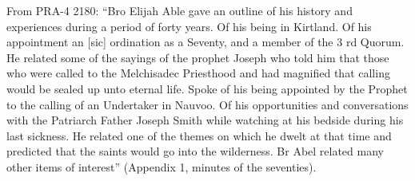 			From PRA-4 2180: ``Bro Elijah Able gave an outline of his history and experiences during a period of forty years. Of his being in Kirtland. Of his appointment an [sic] ordination as a Seventy, and a member of the 3 rd Quorum. He related some of the sayings of the prophet Joseph who told him that those who were called to the Melchisadec Priesthood and had magnified that calling would be sealed up unto eternal life. Spoke of his being appointed by the Prophet to the calling of an Undertaker in Nauvoo. Of his opportunities and conversations with the Patriarch Father Joseph Smith while watching at his bedside during his last sickness. He related one of the themes on which he dwelt at that time and predicted that the saints would go into the wilderness. Br Abel related many other items of interest'' (Appendix 1, minutes of the seventies).